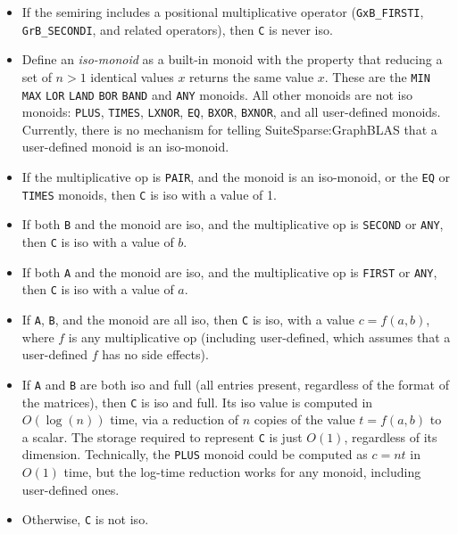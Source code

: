 \documentclass[12pt]{article}
\begin{document}
    \begin{itemize}
    \item If the semiring includes a positional multiplicative operator
    (\verb'GxB_FIRSTI', \verb'GrB_SECONDI', and related operators), then
    \verb'C' is never iso.

    \item Define an {\em iso-monoid} as a built-in monoid with the property
    that reducing a set of $n>1$ identical values $x$ returns the same value
    $x$.  These are the \verb'MIN' \verb'MAX' \verb'LOR' \verb'LAND' \verb'BOR'
    \verb'BAND' and \verb'ANY' monoids.  All other monoids are not iso monoids:
    \verb'PLUS', \verb'TIMES', \verb'LXNOR', \verb'EQ', \verb'BXOR',
    \verb'BXNOR', and all user-defined monoids.   Currently, there is no
    mechanism for telling SuiteSparse:GraphBLAS that a user-defined monoid
    is an iso-monoid.

    \item If the multiplicative op is \verb'PAIR', and the monoid is an
    iso-monoid, or the \verb'EQ' or \verb'TIMES' monoids, then \verb'C' is
    iso with a value of 1.

    \item If both \verb'B' and the monoid are iso, and the multiplicative op is
    \verb'SECOND' or \verb'ANY', then \verb'C' is iso with a value of $b$.

    \item If both \verb'A' and the monoid are iso, and the multiplicative op is
    \verb'FIRST' or \verb'ANY', then \verb'C' is iso with a value of $a$.

    \item If \verb'A', \verb'B', and the monoid are all iso, then \verb'C'
    is iso, with a value $c=f(a,b)$, where $f$ is any multiplicative op
    (including user-defined, which assumes that a user-defined $f$ has no 
    side effects).

    \item If \verb'A' and \verb'B' are both iso and full (all entries present,
    regardless of the format of the matrices), then \verb'C' is iso and full.
    Its iso value is computed in $O(\log(n))$ time, via a reduction of $n$
    copies of the value $t=f(a,b)$ to a scalar.  The storage required to
    represent \verb'C' is just $O(1)$, regardless of its dimension.
    Technically, the \verb'PLUS' monoid could be computed as $c=nt$ in $O(1)$
    time, but the log-time reduction works for any monoid, including
    user-defined ones.

    \item Otherwise, \verb'C' is not iso.
    \end{itemize}
\end{document}
